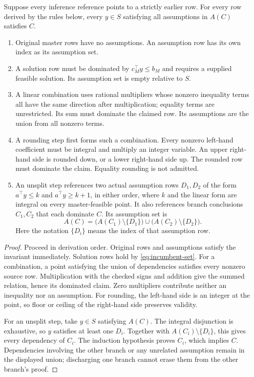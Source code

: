 \begin{proposition}
\label{prop:vipr-invariant}
Suppose every inference reference points to a strictly earlier row. For every row derived by the rules below, every $y\in S$ satisfying all assumptions in $A(C)$ satisfies $C$.
\begin{enumerate}
\item Original master rows have no assumptions. An assumption row has its own index as its assumption set.
\item A solution row must be dominated by $c_M^\top y\leq b_M$ and requires a supplied feasible solution. Its assumption set is empty relative to $S$.
\item A linear combination uses rational multipliers whose nonzero inequality terms all have the same direction after multiplication; equality terms are unrestricted. Its sum must dominate the claimed row. Its assumptions are the union from all nonzero terms.
\item A rounding step first forms such a combination. Every nonzero left-hand coefficient must be integral and multiply an integer variable. An upper right-hand side is rounded down, or a lower right-hand side up. The rounded row must dominate the claim. Equality rounding is not admitted.
\item An unsplit step references two actual assumption rows $D_1,D_2$ of the form $a^\top y\leq k$ and $a^\top y\geq k+1$, in either order, where $k$ and the linear form are integral on every master-feasible point. It also references branch conclusions $C_1,C_2$ that each dominate $C$. Its assumption set is
\[
 A(C)=\bigl(A(C_1)\setminus\{D_1\}\bigr)
       \cup\bigl(A(C_2)\setminus\{D_2\}\bigr).
\]
Here the notation $\{D_i\}$ means the index of that assumption row.
\end{enumerate}
\end{proposition}
\begin{proof}
Proceed in derivation order. Original rows and assumptions satisfy the invariant immediately. Solution rows hold by \eqref{eq:incumbent-set}. For a combination, a point satisfying the union of dependencies satisfies every nonzero source row. Multiplication with the checked signs and addition give the summed relation, hence its dominated claim. Zero multipliers contribute neither an inequality nor an assumption. For rounding, the left-hand side is an integer at the point, so floor or ceiling of the right-hand side preserves validity.

For an unsplit step, take $y\in S$ satisfying $A(C)$. The integral disjunction is exhaustive, so $y$ satisfies at least one $D_i$. Together with $A(C_i)\setminus\{D_i\}$, this gives every dependency of $C_i$. The induction hypothesis proves $C_i$, which implies $C$. Dependencies involving the other branch or any unrelated assumption remain in the displayed union; discharging one branch cannot erase them from the other branch's proof.
\end{proof}

